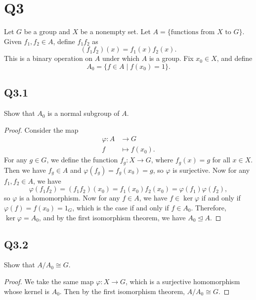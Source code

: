 \documentclass[12pt]{article}
\newenvironment{problem}
    {\begin{lrbox}{\mybox}\begin{minipage}{0.98\textwidth}}
    {\end{minipage}\end{lrbox}\framebox[\textwidth]{\usebox{\mybox}}}
\let\phi\varphi %
\newcommand{\<}{\left\langle} %
\renewcommand{\>}{\right\rangle} %
\let\teq\trianglelefteq %
\let\iso\cong %
\begin{document}
\newpage
\section*{Q3}
\begin{problem}
    Let $G$ be a group and $X$ be a nonempty set. Let $A=\{\text{functions from $X$ to $G$}\}$. Given $f_1,f_2\in A$, define $f_1f_2$ as
    \[(f_1f_2)(x) = f_1(x)f_2(x).\]
    This is a binary operation on $A$ under which $A$ is a group. Fix $x_0\in X$, and define
    \[A_0 = \{f\in A \mid f(x_0) = 1\}.\]
\end{problem}

\subsection*{Q3.1}
\begin{problem}
    Show that $A_0$ is a normal subgroup of $A$.
\end{problem}

\begin{proof}
    Consider the map
    \begin{align*}
        \phi : A &\to G \\
        f &\mapsto f(x_0).
    \end{align*}
    For any $g\in G$, we define the function $f_g: X \to G$, where $f_g(x) = g$ for all $x\in X$. Then we have $f_g\in A$ and $\phi(f_g) = f_g(x_0) = g$, so $\phi$ is surjective. Now for any $f_1,f_2\in A$, we have
    \[\phi(f_1f_2) = (f_1f_2)(x_0) = f_1(x_0)f_2(x_0) = \phi(f_1)\phi(f_2),\]
    so $\phi$ is a homomorphism. Now for any $f\in A$, we have $f\in\ker\phi$ if and only if $\phi(f) = f(x_0) = 1_G$, which is the case if and only if $f\in A_0$. Therefore, $\ker\phi = A_0$, and by the first isomorphism theorem, we have $A_0\teq A$.

\end{proof}

\subsection*{Q3.2}
\begin{problem}
    Show that $A/A_0 \cong G$.
\end{problem}

\begin{proof}
    We take the same map $\phi:X\to G$, which is a surjective homomorphism whose kernel is $A_0$. Then by the first isomorphism theorem, $A/A_0 \iso G$.
    
\end{proof}
\end{document}

